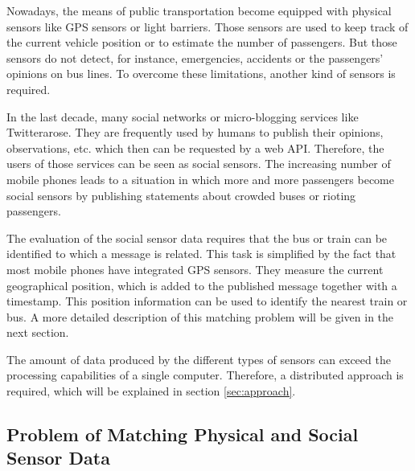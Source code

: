 


Nowadays, the means of public transportation become equipped with
physical sensors like GPS sensors or light barriers. Those sensors are
used to keep track of the current vehicle position or to estimate the
number of passengers. But those sensors do not detect, for instance,
emergencies, accidents or the passengers' opinions on bus lines. To
overcome these limitations, another kind of sensors is required.

In the last decade, many social networks or micro-blogging services
like Twitter\texttrademark arose. They are frequently used by humans
to publish their opinions, observations, etc. which then can be
requested by a web API. Therefore, the users of those services can be
seen as social sensors. The increasing number of mobile phones leads
to a situation in which more and more passengers become social sensors
by publishing statements about crowded buses or rioting passengers.

The evaluation of the social sensor data requires that the bus or
train can be identified to which a message is related. This task is
simplified by the fact that most mobile phones have integrated GPS
sensors. They measure the current geographical position, which is
added to the published message together with a timestamp. This
position information can be used to identify the nearest train or
bus. A more detailed description of this matching problem will be
given in the next section.

The amount of data produced by the different types of sensors can
exceed the processing capabilities of a single computer. Therefore, a
distributed approach is required, which will be explained in section
\ref{sec:approach}.

\subsection{Problem of Matching Physical and Social Sensor Data}\label{sec:problem}

